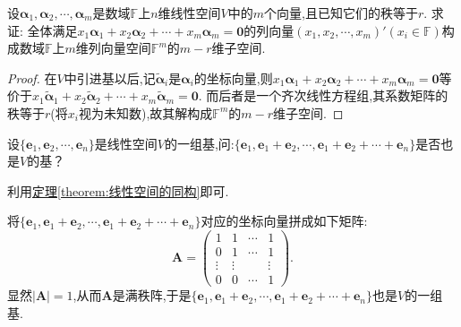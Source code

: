 \documentclass[lang=cn,newtx,10pt,scheme=chinese]{elegantbook}
\begin{document}
\begin{proposition}\label{proposition:向量方程的解空间}
设\(\boldsymbol{\alpha}_1,\boldsymbol{\alpha}_2,\cdots,\boldsymbol{\alpha}_m\)是数域\(\mathbb{F}\)上\(n\)维线性空间\(V\)中的\(m\)个向量,且已知它们的秩等于\(r\). 求证: 全体满足\(x_1\boldsymbol{\alpha}_1 + x_2\boldsymbol{\alpha}_2+\cdots + x_m\boldsymbol{\alpha}_m = \boldsymbol{0}\)的列向量\((x_1,x_2,\cdots,x_m)'(x_i\in\mathbb{F})\)构成数域\(\mathbb{F}\)上\(m\)维列向量空间\(\mathbb{F}^m\)的\(m - r\)维子空间.
\end{proposition}
\begin{proof}
在\(V\)中引进基以后,记\(\widetilde{\boldsymbol{\alpha}}_i\)是\(\boldsymbol{\alpha}_i\)的坐标向量,则\(x_1\boldsymbol{\alpha}_1 + x_2\boldsymbol{\alpha}_2+\cdots + x_m\boldsymbol{\alpha}_m = \boldsymbol{0}\)等价于\(x_1\widetilde{\boldsymbol{\alpha}}_1 + x_2\widetilde{\boldsymbol{\alpha}}_2+\cdots + x_m\widetilde{\boldsymbol{\alpha}}_m = \boldsymbol{0}\). 而后者是一个齐次线性方程组,其系数矩阵的秩等于\(r\)(将\(x_i\)视为未知数),故其解构成\(\mathbb{F}^m\)的\(m - r\)维子空间.
\end{proof}


\begin{example}
设\(\{\boldsymbol{e}_1,\boldsymbol{e}_2,\cdots,\boldsymbol{e}_n\}\)是线性空间\(V\)的一组基,问:\(\{\boldsymbol{e}_1,\boldsymbol{e}_1+\boldsymbol{e}_2,\cdots,\boldsymbol{e}_1+\boldsymbol{e}_2+\cdots+\boldsymbol{e}_n\}\)是否也是\(V\)的基？
\end{example}
\begin{note}
    利用\hyperref[theorem:线性空间的同构]{定理\ref{theorem:线性空间的同构}}即可.
\end{note}
\begin{solution}
    将\(\{\boldsymbol{e}_1,\boldsymbol{e}_1+\boldsymbol{e}_2,\cdots,\boldsymbol{e}_1+\boldsymbol{e}_2+\cdots+\boldsymbol{e}_n\}\)对应的坐标向量拼成如下矩阵:
\[
\boldsymbol{A}=\begin{pmatrix}
1&1&\cdots&1\\
0&1&\cdots&1\\
\vdots&\vdots&&\vdots\\
0&0&\cdots&1
\end{pmatrix}.
\]
显然\(|\boldsymbol{A}| = 1\),从而\(\boldsymbol{A}\)是满秩阵,于是\(\{\boldsymbol{e}_1,\boldsymbol{e}_1+\boldsymbol{e}_2,\cdots,\boldsymbol{e}_1+\boldsymbol{e}_2+\cdots+\boldsymbol{e}_n\}\)也是\(V\)的一组基. 
\end{solution}
\end{document}
